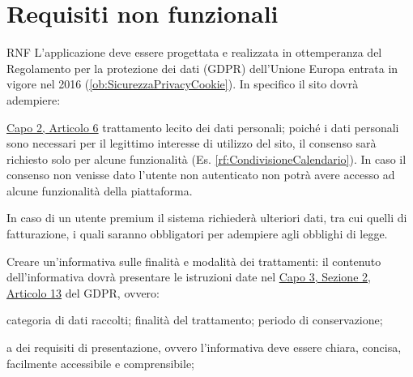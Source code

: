\section{Requisiti non funzionali}
\label{sec:RequisitiNonFunzionali}

\begin{listaPersonale}{RNF}
       L'applicazione deve essere progettata e realizzata in ottemperanza del Regolamento per la protezione dei dati (GDPR) dell'Unione Europa entrata in vigore nel 2016 (\ref{ob:SicurezzaPrivacyCookie}). In specifico il sito dovrà adempiere:
      \begin{listaPersonale2}[RNF]{}
             \href{https://eur-lex.europa.eu/legal-content/IT/TXT/?uri=uriserv:OJ.L_.2016.119.01.0001.01.ITA&toc=OJ:L:2016:119:TOC#d1e1898-1-1}{Capo 2, Articolo 6} trattamento lecito dei dati personali; poiché i dati personali sono necessari per il legittimo interesse di utilizzo del sito, il consenso sarà richiesto solo per alcune funzionalità (Es. \ref{rf:CondivisioneCalendario}). In caso il consenso non venisse dato l'utente non autenticato non potrà avere accesso ad alcune funzionalità della piattaforma.
            \begin{listaPersonale3}[RNF]{}
                   In caso di un utente premium il sistema richiederà ulteriori dati, tra cui quelli di fatturazione, i quali saranno obbligatori per adempiere agli obblighi di legge.
            \end{listaPersonale3}

             Creare un'informativa sulle finalità e modalità dei trattamenti: il contenuto dell'informativa dovrà presentare le istruzioni date nel \href{https://eur-lex.europa.eu/legal-content/IT/TXT/?uri=uriserv:OJ.L_.2016.119.01.0001.01.ITA&toc=OJ:L:2016:119:TOC#d1e2261-1-1}{Capo 3, Sezione 2, Articolo 13} del GDPR, ovvero:
            \begin{listaPersonale3}[RNF]{}
                   categoria di dati raccolti;
                   finalità del trattamento;
                   periodo di conservazione;
            \end{listaPersonale3}

             a dei requisiti di presentazione, ovvero l'informativa deve essere chiara, concisa, facilmente accessibile e comprensibile;


\end{listaPersonale2}
\end{listaPersonale}
